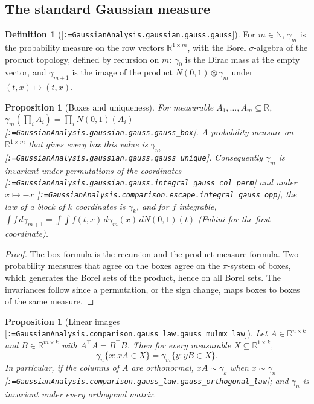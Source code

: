 \documentclass[11pt]{article}
\makeatletter
\newcommand{\formal@break}[1]{\@tfor\formal@tok:=#1\do{%
  \formal@tok
  \expandafter\ifx\formal@tok.\allowbreak\else
  \expandafter\ifx\formal@tok\_\allowbreak\fi\fi}}
\DeclareRobustCommand{\formal}[1]{\textnormal{[\texttt{\small\formal@break{#1}}]}}
\newcommand{\R}{\mathbb{R}}
\newcommand{\N}{\mathbb{N}}
\newcommand{\gauss}{\gamma}
\theoremstyle{plain}
\newtheorem{proposition}[theorem]{Proposition}
\theoremstyle{definition}
\newtheorem{definition}[theorem]{Definition}
\makeatother
\begin{document}
\subsection{The standard Gaussian measure}\label{sec:gauss}

\begin{definition}[\formal{GaussianAnalysis.gaussian.gauss.gauss}]
For $m \in \N$, $\gauss_m$ is the probability measure on the row vectors
$\R^{1\times m}$, with the Borel $\sigma$-algebra of the product topology,
defined by recursion on $m$: $\gauss_0$ is the Dirac mass at the empty
vector, and $\gauss_{m+1}$ is the image of the product $N(0,1) \otimes \gauss_m$
under $(t, x) \mapsto (t, x)$.
\end{definition}

\begin{proposition}[Boxes and uniqueness]\label{prop:gaussE}
For measurable $A_1, \dots, A_m \subseteq \R$,
$\gauss_m(\prod_i A_i) = \prod_i N(0,1)(A_i)$
\formal{GaussianAnalysis.gaussian.gauss.gauss\_box}. A probability
measure on $\R^{1\times m}$ that gives every box this value is $\gauss_m$
\formal{GaussianAnalysis.gaussian.gauss.gauss\_unique}. Consequently $\gauss_m$
is invariant under permutations of the coordinates
\formal{GaussianAnalysis.gaussian.gauss.integral\_gauss\_col\_perm} and
under $x \mapsto -x$ \formal{GaussianAnalysis.comparison.escape.integral\_gauss\_opp},
the law of a block of $k$ coordinates is $\gauss_k$, and for
$f$ integrable, $\int f\, d\gauss_{m+1} = \int \int f(t, x)\, d\gauss_m(x)\, dN(0,1)(t)$
(Fubini for the first coordinate).
\end{proposition}

\begin{proof}
The box formula is the recursion and the product measure formula. Two
probability measures that agree on the boxes agree on the $\pi$-system of
boxes, which generates the Borel sets of the product, hence on all Borel
sets. The invariances follow since a permutation, or the sign change, maps
boxes to boxes of the same measure.
\end{proof}

\begin{proposition}[Linear images \formal{GaussianAnalysis.comparison.gauss\_law.gauss\_mulmx\_law}]\label{prop:mulmx}
Let $A \in \R^{n\times k}$ and $B \in \R^{m \times k}$ with
$A^{\top} A = B^{\top} B$. Then for every measurable $X \subseteq \R^{1\times k}$,
\[
\gauss_n\{x : xA \in X\} = \gauss_m\{y : yB \in X\}.
\]
In particular, if the columns of $A$ are orthonormal, $x A \sim \gauss_k$
when $x \sim \gauss_n$ \formal{GaussianAnalysis.comparison.gauss\_law.gauss\_orthogonal\_law};
and $\gauss_n$ is invariant under every orthogonal matrix.
\end{proposition}
\end{document}
